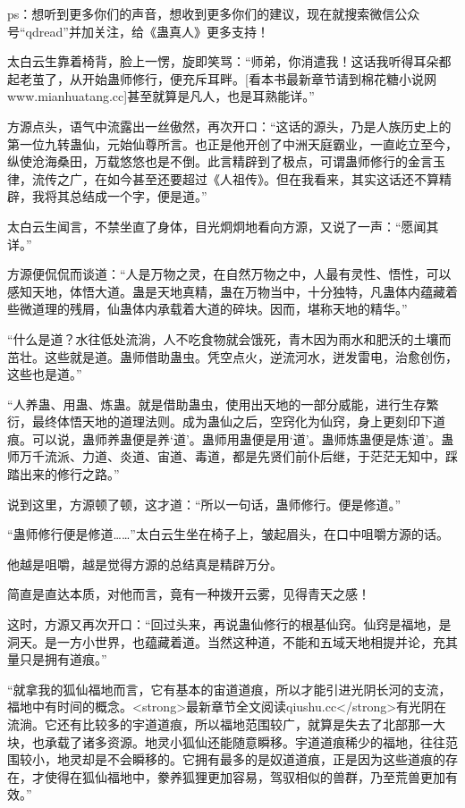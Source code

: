 
\begin{this_body}

ps：想听到更多你们的声音，想收到更多你们的建议，现在就搜索微信公众号“qdread”并加关注，给《蛊真人》更多支持！

太白云生靠着椅背，脸上一愣，旋即笑骂：“师弟，你消遣我！这话我听得耳朵都起老茧了，从开始蛊师修行，便充斥耳畔。[看本书最新章节请到棉花糖小说网www.mianhuatang.cc]甚至就算是凡人，也是耳熟能详。”

方源点头，语气中流露出一丝傲然，再次开口：“这话的源头，乃是人族历史上的第一位九转蛊仙，元始仙尊所言。也正是他开创了中洲天庭霸业，一直屹立至今，纵使沧海桑田，万载悠悠也是不倒。此言精辟到了极点，可谓蛊师修行的金言玉律，流传之广，在如今甚至还要超过《人祖传》。但在我看来，其实这话还不算精辟，我将其总结成一个字，便是道。”

太白云生闻言，不禁坐直了身体，目光炯炯地看向方源，又说了一声：“愿闻其详。”

方源便侃侃而谈道：“人是万物之灵，在自然万物之中，人最有灵性、悟性，可以感知天地，体悟大道。蛊是天地真精，蛊在万物当中，十分独特，凡蛊体内蕴藏着些微道理的残屑，仙蛊体内承载着大道的碎块。因而，堪称天地的精华。”

“什么是道？水往低处流淌，人不吃食物就会饿死，青木因为雨水和肥沃的土壤而茁壮。这些就是道。蛊师借助蛊虫。凭空点火，逆流河水，迸发雷电，治愈创伤，这些也是道。”

“人养蛊、用蛊、炼蛊。就是借助蛊虫，使用出天地的一部分威能，进行生存繁衍，最终体悟天地的道理法则。成为蛊仙之后，空窍化为仙窍，身上更刻印下道痕。可以说，蛊师养蛊便是养‘道’。蛊师用蛊便是用‘道’。蛊师炼蛊便是炼‘道’。蛊师万千流派、力道、炎道、宙道、毒道，都是先贤们前仆后继，于茫茫无知中，踩踏出来的修行之路。”

说到这里，方源顿了顿，这才道：“所以一句话，蛊师修行。便是修道。”

“蛊师修行便是修道……”太白云生坐在椅子上，皱起眉头，在口中咀嚼方源的话。

他越是咀嚼，越是觉得方源的总结真是精辟万分。

简直是直达本质，对他而言，竟有一种拨开云雾，见得青天之感！

这时，方源又再次开口：“回过头来，再说蛊仙修行的根基仙窍。仙窍是福地，是洞天。是一方小世界，也蕴藏着道。当然这种道，不能和五域天地相提并论，充其量只是拥有道痕。”

“就拿我的狐仙福地而言，它有基本的宙道道痕，所以才能引进光阴长河的支流，福地中有时间的概念。<strong>最新章节全文阅读qiushu.cc</strong>有光阴在流淌。它还有比较多的宇道道痕，所以福地范围较广，就算是失去了北部那一大块，也承载了诸多资源。地灵小狐仙还能随意瞬移。宇道道痕稀少的福地，往往范围较小，地灵却是不会瞬移的。它拥有最多的是奴道道痕，正是因为这些道痕的存在，才使得在狐仙福地中，豢养狐狸更加容易，驾驭相似的兽群，乃至荒兽更加有效。”


\end{this_body}
